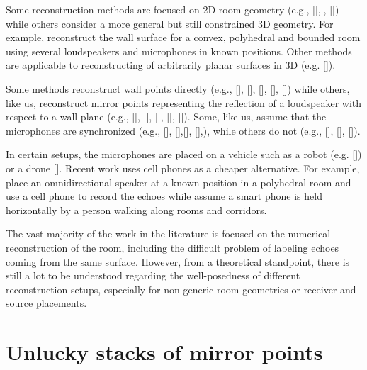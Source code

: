 \documentclass[reqno]{amsart}
\begin{document}
Some reconstruction methods are focused on 2D room geometry (e.g., [],], []) while others consider a more general but still constrained 3D geometry. For example,   reconstruct the wall surface for a convex, polyhedral and bounded room using several loudspeakers and microphones in known positions. Other methods are applicable to reconstructing of arbitrarily planar surfaces in 3D (e.g. []). 


Some methods reconstruct wall points directly  (e.g., [], [], [], [], [])
while others, like us, reconstruct mirror points representing the reflection of a loudspeaker with respect to a wall  plane (e.g.,  [], [], [], [], []).
Some, like us, assume that the microphones are synchronized (e.g.,  [],  [],[],  [],), while others do not (e.g., [], [],  []). 



In certain setups,  the microphones are placed on a vehicle such as a robot (e.g. []) or a drone []. Recent work  uses cell phones as a cheaper alternative. For example,  place an omnidirectional speaker at a known position in a polyhedral room 
and use a cell phone to record the echoes while  assume a smart phone is  held horizontally by a person walking along rooms and corridors. 

The vast majority of the work in the literature is focused on the numerical reconstruction 
of the room, including the difficult problem of labeling echoes coming from the same surface. However, from a theoretical standpoint, there is still a lot to be understood regarding the well-posedness of different reconstruction setups, especially for non-generic room geometries or receiver and source placements.  







\section{Unlucky stacks of mirror points} \label{sStacks}
\end{document}
